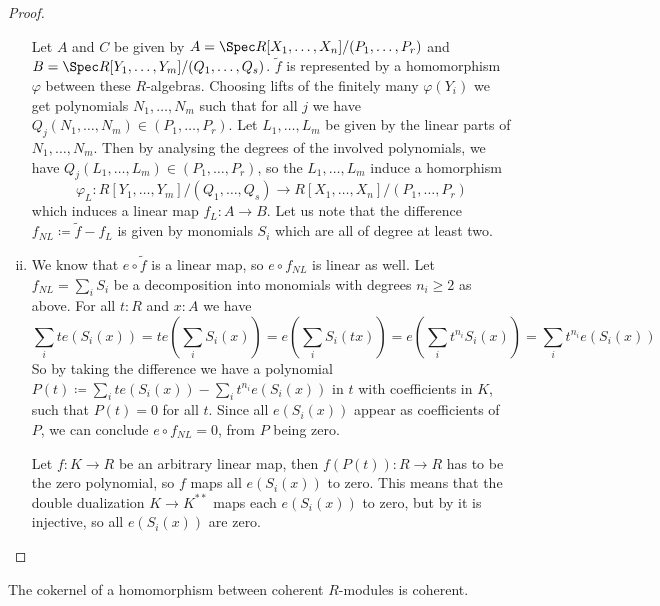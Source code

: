 \begin{proof}
\begin{enumerate}[(i)]
  Let $A$ and $C$ be given by $A=\Spec R[X_1,\dots,X_n]/(P_1,\dots,P_r)$ and $B=\Spec R[Y_1,\dots,Y_m]/(Q_1,\dots,Q_s)$.
  $\tilde{f}$ is represented by a homomorphism $\varphi$ between these $R$-algebras.
  Choosing lifts of the finitely many $\varphi(Y_i)$ we get polynomials $N_1,\dots,N_m$
  such that for all $j$ we have $Q_j(N_1,\dots,N_m)\in (P_1,\dots,P_r)$.
  Let $L_1,\dots,L_m$ be given by the linear parts of $N_1,\dots,N_m$.
  Then by analysing the degrees of the involved polynomials, we have $Q_j(L_1,\dots,L_m)\in (P_1,\dots,P_r)$, so the $L_1,\dots,L_m$ induce a homorphism
  \[
  \varphi_L: R[Y_1,\dots,Y_m]/(Q_1,\dots,Q_s) \to R[X_1,\dots,X_n]/(P_1,\dots,P_r)
  \]
  which induces a linear map $f_L:A\to B$.
  Let us note that the difference $f_{NL}\coloneq \tilde{f}-f_L$ is given by monomials $S_i$ which are all of degree at least two.
  \item We know that $e\circ \tilde{f}$ is a linear map, so $e\circ f_{NL}$ is linear as well.
  Let $f_{NL}=\sum_i S_i$ be a decomposition into monomials with degrees $n_i\geq 2$ as above.
  For all $t:R$ and $x:A$ we have
  \[
  \sum_i te(S_i(x))=te(\sum_i S_i(x))=e(\sum_i S_i(tx))=e(\sum_i t^{n_i}S_i(x))=\sum_i t^{n_i}e( S_i(x))
  \]
  So by taking the difference we have a polynomial $P(t)\coloneq \sum_i te(S_i(x))-\sum_i t^{n_i}e( S_i(x))$ in $t$ with coefficients in $K$, such that $P(t)=0$ for all $t$.
  Since all $e(S_i(x))$ appear as coefficients of $P$, we can conclude $e\circ f_{NL}=0$, from $P$ being zero.

  Let $f:K\to R$ be an arbitrary linear map, then $f(P(t)):R\to R$ has to be the zero polynomial,
  so $f$ maps all $e(S_i(x))$ to zero.
  This means that the double dualization $K\to K^{\ast\ast}$ maps each $e(S_i(x))$ to zero,
  but by  it is injective, so all $e(S_i(x))$ are zero.
  \end{enumerate}
\end{proof}

\begin{lemma}
  \label{coherent-kernels}
  The cokernel of a homomorphism between coherent $R$-modules is coherent.  
\end{lemma}

